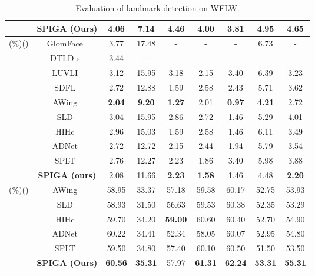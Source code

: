 \documentclass{bmvc2k}
\newcommand{\first}[1]{{\color{blue} \textbf{#1}}}
\newcommand{\second}[1]{{\color{green} #1}}
\newcommand{\third}[1]{{\color{red} #1}}
\begin{document}
\begin{table}
\begin{center}
\begin{tabular}{c|c|ccccccc}
& \textbf{SPIGA (Ours)}       & \first{4.06} & \second{7.14} & \textbf{4.46} & \first{4.00} & \first{3.81} & \first{4.95} & \first{4.65}\\
\hline
\hline 
\multirow{7}{*}{ (\%)()} 
& GlomFace~\cite{Zhu22glomface}             & 3.77 & 17.48  & - & - & - & 6.73 & - \\
& DTLD-s~\cite{Li22casctransf}             & 3.44 & - & - & - & - & - & -\\
& LUVLI~\cite{Kumar20luvli}                 & 3.12 & 15.95 & 3.18 & 2.15 & 3.40 & 6.39 & \third{3.23} \\
& SDFL~\cite{LinTIP21}               & 2.72 & 12.88  & \second{1.59} & 2.58 & 2.43 & 5.71 & 3.62\\
& AWing~\cite{Wang19Awing}                  & \first{2.04} & \first{9.20} & \first{1.27} & \third{2.01} & \first{0.97} & \first{4.21} & \second{2.72} \\ 
& SLD~\cite{Li20sld}                        & 3.04 & 15.95 & 2.86 & 2.72 & \second{1.46} & \third{5.29} & 4.01 \\
& HIHc~\cite{Lan21hih}                      & 2.96 & 15.03 & \second{1.59} & 2.58 & \second{1.46} & 6.11 & 3.49 \\
& ADNet~\cite{Huang21ADnet}         & \third{2.72} & 12.72 & \third{2.15} & 2.44 & \third{1.94} & 5.79 & 3.54 \\
& SPLT~\cite{Xia22slpt}             & 2.76 & \third{12.27} & 2.23 & \second{1.86} & 3.40 & 5.98 & 3.88\\
\cline{2-9}
& \textbf{SPIGA (ours)}             & \second{2.08} & \second{11.66} & \textbf{2.23} & \first{1.58} & \second{1.46} & \second{4.48} & \first{2.20}\\
\hline
\hline 
\multirow{4}{*}{ (\%)()} 
& AWing~\cite{Wang19Awing}                  & 58.95 & 33.37 & 57.18 & 59.58 & 60.17 & \third{52.75} & 53.93 \\ 
& SLD~\cite{Li20sld}                        & 58.93 & 31.50 & 56.63 & 59.53 & 60.38 & 52.35 & 53.29 \\
& HIHc~\cite{Lan21hih}                      & \third{59.70} & 34.20 & \first{59.00} & \second{60.60} & \third{60.40} & 52.70 & \second{54.90} \\
& ADNet~\cite{Huang21ADnet}                 & \second{60.22} & \third{34.41} & 52.34 & 58.05 & 60.07 & \second{52.95} & \third{54.80} \\
& SPLT~\cite{Xia22slpt}                 & 59.50 & \second{34.80} & \third{57.40} & \third{60.10} & \second{60.50} & 51.50 & 53.50\\
\cline{2-9}
& \textbf{SPIGA (Ours)}                             & \first{60.56} & \first{35.31} & \second{57.97} & \first{61.31} & \first{62.24} & \first{53.31} & \first{55.31}\\
\hline
\end{tabular}
\end{center}
\caption{Evaluation of landmark detection on WFLW.}
\label{tab:wflw}
\end{table}
\end{document}
